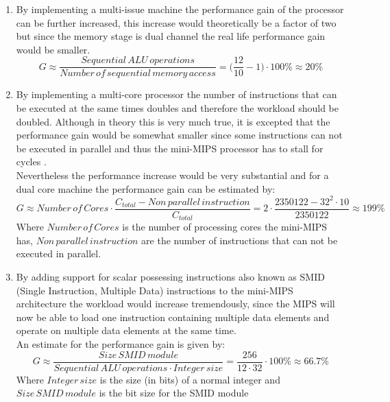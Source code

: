 \documentclass[10pt]{article}
\begin{document}
\begin{enumerate}
\item By implementing a multi-issue machine the performance gain of the processor can be further increased, this increase would theoretically be a factor of two but since the memory stage is dual channel the real life performance gain would be smaller.\\

\begin{equation}
    G \approx \frac{Sequential \, ALU \, operations}{Number\, of\, sequential \, memory \, access} = \Big( \frac{12}{10} - 1 \Big) \cdot 100 \% \approx 20 \%
\end{equation}

\item By implementing a multi-core processor the number of instructions that can be executed at the same times doubles and therefore the workload should be doubled. Although in theory this is very much true, it is excepted that the performance gain would be somewhat smaller since some instructions can not be executed in parallel and thus the mini-MIPS processor has to stall for cycles .\\
Nevertheless the performance increase would be very substantial and for a dual core machine the performance gain can be estimated by:
\begin{equation}
    G \approx Number \, of \, Cores \cdot \frac{C_{total} -  Non \, parallel \, instruction }{C_{total}} = 2 \cdot \frac{2350122 - 32^2 \cdot 10}{2350122} \approx 199\%
\end{equation}
Where $Number \, of \, Cores $ is the number of processing cores the mini-MIPS has, $ Non \, parallel \, instruction $ are the number of instructions that can not be executed in parallel.

\item By adding support for scalar possessing instructions also known as SMID (Single Instruction, Multiple Data) instructions to the mini-MIPS architecture the workload would increase tremendously, since the MIPS will now be able to load one instruction containing multiple data elements and operate on multiple data elements at the same time.\\
An estimate for the performance gain is given by:
\begin{equation}
    G \approx \frac{Size \, SMID \, module }{Sequential \, ALU \, operations \cdot Integer \, size } = \frac{ 256}{12 \cdot 32}  \cdot 100\% \approx 66.7 \%
\end{equation}
Where $ Integer \, size$ is the size (in bits) of a normal integer and $ Size \, SMID \, module$ is the bit size for the SMID module

\end{enumerate}
\end{document}
